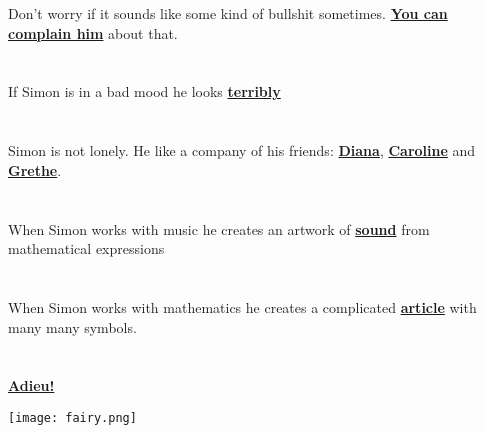 \documentclass[a4paper]{article}
\begin{document}
Don't worry if it sounds like some kind of bullshit sometimes. \href{mailto:simonas.mamaitis@gmail.com}{\textbf{You can complain him}} about that.

\section{}

If Simon is in a bad mood he looks \href{https://www.facebook.com/photo.php?fbid=1791779717765839&set=a.1720498398227305.1073741828.100008014839713&type=3&theater}{\textbf{terribly}}

\section{}

Simon is not lonely. He like a company of his friends: \href{http://pastebin.com/v9xYFc3i}{\textbf{Diana}}, \href{http://pastebin.com/yqhNy1UR}{\textbf{Caroline}} and \href{http://pastebin.com/hjv7bP2T}{\textbf{Grethe}}.

\section{}

When Simon works with music he creates an artwork of  \href{https://soundcloud.com/naktinis-saimonas/simon-production}{\textbf{sound}} from mathematical expressions

\section{}

When Simon works with mathematics he creates a complicated \href{run:diskr.pdf}{\textbf{article}} with many many symbols.

\section{}

\href{http://www.youtube.com/watch?v=7WwLT32_VAk&t=23m30s}{\textbf{Adieu!}}

\begin{center}
\texttt{[image: fairy.png]}
\end{center}
\end{document}
